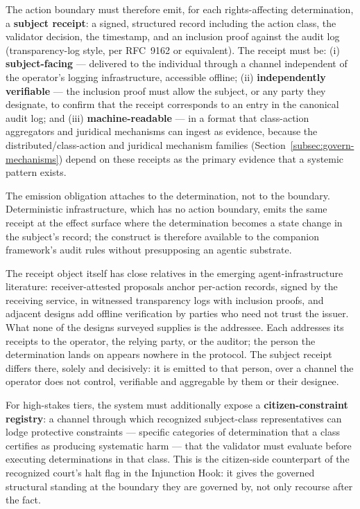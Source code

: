 \documentclass{article}
\theoremstyle{definition}
\begin{document}
The action boundary must therefore emit, for each rights-affecting determination, a \textbf{subject receipt}: a signed, structured record including the action class, the validator decision, the timestamp, and an inclusion proof against the audit log (transparency-log style, per RFC~9162 \citep{rfc9162} or equivalent). The receipt must be: (i) \textbf{subject-facing} --- delivered to the individual through a channel independent of the operator's logging infrastructure, accessible offline; (ii) \textbf{independently verifiable} --- the inclusion proof must allow the subject, or any party they designate, to confirm that the receipt corresponds to an entry in the canonical audit log; and (iii) \textbf{machine-readable} --- in a format that class-action aggregators and juridical mechanisms can ingest as evidence, because the distributed/class-action and juridical mechanism families (Section~\ref{subsec:govern-mechanisms}) depend on these receipts as the primary evidence that a systemic pattern exists.

The emission obligation attaches to the determination, not to the boundary. Deterministic infrastructure, which has no action boundary, emits the same receipt at the effect surface where the determination becomes a state change in the subject's record; the construct is therefore available to the companion framework's audit rules \citep{aravind2026dpi} without presupposing an agentic substrate.

The receipt object itself has close relatives in the emerging agent-infrastructure literature: receiver-attested proposals anchor per-action records, signed by the receiving service, in witnessed transparency logs with inclusion proofs, and adjacent designs add offline verification by parties who need not trust the issuer. What none of the designs surveyed supplies is the addressee. Each addresses its receipts to the operator, the relying party, or the auditor; the person the determination lands on appears nowhere in the protocol. The subject receipt differs there, solely and decisively: it is emitted to that person, over a channel the operator does not control, verifiable and aggregable by them or their designee.

For high-stakes tiers, the system must additionally expose a \textbf{citizen-constraint registry}: a channel through which recognized subject-class representatives can lodge protective constraints --- specific categories of determination that a class certifies as producing systematic harm --- that the validator must evaluate before executing determinations in that class. This is the citizen-side counterpart of the recognized court's halt flag in the Injunction Hook: it gives the governed structural standing at the boundary they are governed by, not only recourse after the fact.
\end{document}
